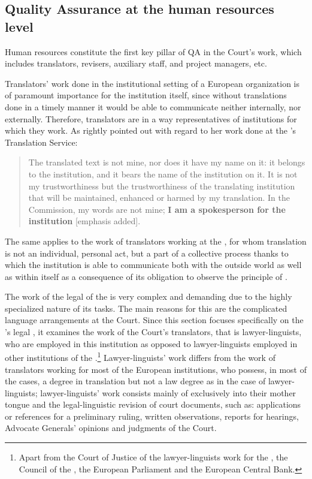 \documentclass[output=paper]{langsci/langscibook}
\begin{document}
\subsection{Quality Assurance at the human resources level}\label{sec:kozbial:4.1}

Human resources constitute the first key pillar of QA in the Court’s  work, which includes translators, revisers, auxiliary staff, and project managers, etc.

Translators’ work done in the institutional setting of a European organization is of paramount importance for the institution itself, since without translations done in a timely manner it would be able to communicate neither internally, nor externally. Therefore, translators are in a way representatives of institutions for which they work. As \citet[24]{Koskinen2008} rightly pointed out with regard to her work done at the ’s Translation Service:

\begin{quote}
The translated text is not mine, nor does it have my name on it: it belongs to the institution, and it bears the name of the institution on it. It is not my trustworthiness but the trustworthiness of the translating institution that will be maintained, enhanced or harmed by my translation. In the Commission, my words are not mine; \textbf{I am a spokesperson for the institution} [emphasis added].
\end{quote}

The same applies to the work of translators working at the , for whom translation is not an individual, personal act, but a part of a collective process thanks to which the institution is able to communicate both with the outside world as well as within itself as a consequence of its obligation to observe the principle of .

The work of the legal  of the  is very complex and demanding due to the highly specialized nature of its tasks. The main reasons for this are the complicated language arrangements at the Court. Since this section focuses specifically on the ’s legal , it examines the work of the Court’s translators, that is lawyer-linguists, who are employed in this institution as opposed to lawyer-linguists employed in other institutions of the .\footnote{Apart from the Court of Justice of the  lawyer-linguists work for the , the Council of the , the European Parliament and the European Central Bank.} Lawyer-linguists’ work differs from the work of translators working for most of the European institutions, who possess, in most of the cases, a degree in translation but not a law degree as in the case of lawyer-linguists; lawyer-linguists’ work consists mainly of  exclusively into their mother tongue \citep[15]{McAuliffe2016} and the legal-linguistic revision of court documents, such as: applications or references for a preliminary ruling, written observations, reports for  hearings, Advocate Generals’ opinions and judgments of the Court.
\end{document}
